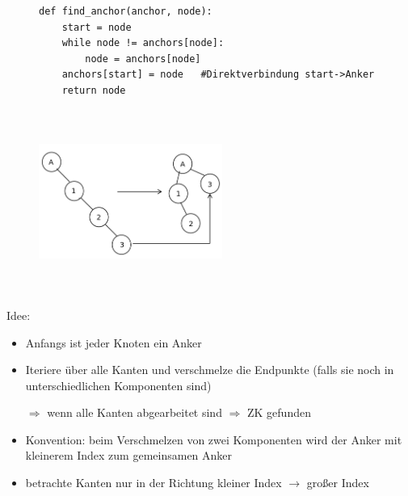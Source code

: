 \documentclass[11pt, fleqn]{scrreprt}
\begin{document}
            \begin{figure}[htbp]
                \begin{minipage}[t]{11cm}
                    \vspace{0cm}
                    \begin{verbatim}
def find_anchor(anchor, node):
    start = node
    while node != anchors[node]:
        node = anchors[node]
    anchors[start] = node   #Direktverbindung start->Anker
    return node
                    \end{verbatim}
                \end{minipage}
                \begin{minipage}[t]{6cm}
                    \vspace{0.0cm}
                    \includegraphics[width=6cm,height=6cm,keepaspectratio]{./Pictures/Stern.png}
                \end{minipage}
            \end{figure}


            Idee:
            \begin{itemize}
                \item Anfangs ist jeder Knoten ein Anker
                \item Iteriere über alle Kanten und verschmelze die Endpunkte (falls sie noch in unterschiedlichen Komponenten sind)
                \item[$\Rightarrow$] wenn alle Kanten abgearbeitet sind $\Rightarrow$ ZK gefunden
                \item Konvention: beim Verschmelzen von zwei Komponenten wird der Anker mit kleinerem Index zum gemeinsamen Anker
                \item betrachte Kanten nur in der Richtung kleiner Index $\rightarrow$ großer Index
            \end{itemize}
\end{document}

